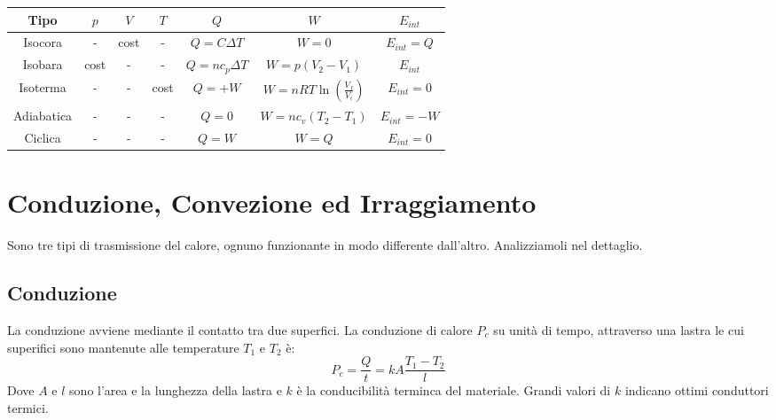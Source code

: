             
            \begin{tabular}{ |c|c|c|c|c|c|c| } 
                \hline
                    \textbf{Tipo} & $p$ & $V$ & $T$ & $Q$ & $W$ & $E_{int}$ \\
                \hline
                    Isocora 
                        & - 
                        & cost 
                        & - 
                        & $Q = C\Delta T$ 
                        & $W = 0$
                        & $E_{int} = Q$ \\
                \hline
                    Isobara
                        & cost
                        & - 
                        & - 
                        & $Q = nc_p\Delta T$
                        & $W = p(V_2 - V_1)$
                        & $E_{int}$ \\
                \hline
                    Isoterma
                        & -
                        & - 
                        & cost
                        & $Q = + W$
                        & $W = nRT\ln(\frac{V_f}{V_i})$
                        & $E_{int} = 0$ \\
                \hline
                    Adiabatica
                        & -
                        & - 
                        & -
                        & $Q = 0$
                        & $W = nc_v(T_2 - T_1)$
                        & $E_{int} = -W$ \\
                \hline
                    Ciclica
                        & -
                        & - 
                        & -
                        & $Q = W$
                        & $W = Q$
                        & $E_{int} = 0$ \\
                \hline
            \end{tabular}
            

        \section{Conduzione, Convezione ed Irraggiamento} Sono tre tipi di 
        trasmissione del calore, ognuno funzionante in modo differente 
        dall'altro. Analizziamoli nel dettaglio.

            \subsection{Conduzione} La conduzione avviene mediante il contatto
            tra due superfici. La conduzione di calore $P_c$ su unità di tempo,
            attraverso una lastra le cui superifici sono mantenute alle 
            temperature $T_1$ e $T_2$ è:
                \begin{equation}
                    P_c = \frac{Q}{t} = kA\frac{T_1 - T_2}{l}
                \end{equation}
            Dove $A$ e $l$ sono l'area e la lunghezza della lastra e $k$ è la 
            conducibilità terminca del materiale. Grandi valori di $k$ indicano
            ottimi conduttori termici.

